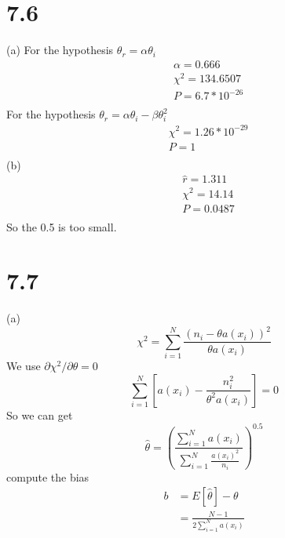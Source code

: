 \documentclass{article}
\begin{document}
\begin{CJK*}{GBK}{song}
\section{7.6}
(a)
For the hypothesis $\theta_r=\alpha \theta_i$
\begin{equation}
\begin{aligned}
&\alpha =0.666\\
&\chi^2=134.6507\\
&P=6.7*10^{-26}\\
\end{aligned}
\end{equation}
For the hypothesis $\theta_r=\alpha \theta_i-\beta \theta_i^2$
\begin{equation}
\begin{aligned}
&\chi^2=1.26*10^{-29}\\
&P=1\\
\end{aligned}
\end{equation}
(b)
\begin{equation}
\begin{aligned}
&\hat{r} =1.311\\
&\chi^2=14.14\\
&P=0.0487\\
\end{aligned}
\end{equation}
So the  0.5 is too small.

\section{7.7}
(a)
\begin{equation}
\chi^2=\sum_{i=1}^N\frac{(n_i-\theta a(x_i))^2}{\theta a(x_i)}
\end{equation}
We use $\partial \chi^2/\partial\theta=0$
\begin{equation}
\sum_{i=1}^N[a(x_i)-\frac{n_i^2}{\theta^2a(x_i)}]=0
\end{equation}
So we can get
\begin{equation}
\hat{\theta}=(\frac{\sum_{i=1}^Na(x_i)}{\sum_{i=1}^N\frac{a(x_i)^2}{n_i}})^{0.5}
\end{equation}
compute the bias
\begin{equation}
\begin{aligned}
b&=E[\hat{\theta}]-\theta\\
&=\frac{N-1}{2\sum_{i=1}^Na(x_i)}
\end{aligned}
\end{equation}




\end{CJK*}
\end{document}
